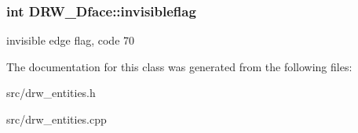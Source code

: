 \subsubsection[{invisibleflag}]{\setlength{\rightskip}{0pt plus 5cm}int D\+R\+W\+\_\+Dface\+::invisibleflag}\label{class_d_r_w__3_dface_a0fbb465670025bbd116aef1804fa5b44}
invisible edge flag, code 70 

The documentation for this class was generated from the following files\+:\begin{DoxyCompactItemize}
\item 
src/drw\+\_\+entities.\+h\item 
src/drw\+\_\+entities.\+cpp\end{DoxyCompactItemize}

